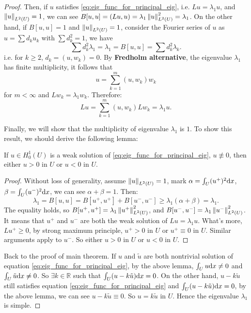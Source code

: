 \begin{proof}
    Then, if $u$ satisfies \eqref{eq:eig_func_for_principal_eig}, i.e. $Lu=\lambda_{1}u$, and $\left\|u\right\|_{L^{2}(U)}=1$, we can see $B[u,u]=(Lu,u)=\lambda_{1}\left\|u\right\|_{L^{2}(U)}^{2}=\lambda_{1}$. On the other hand, if $B[u,u]=1$ and $\left\|u\right\|_{L^{2}(U)}=1$, consider the Fourier series of $u$ as $u=\sum d_{k}u_{k}$ with $\sum d_{k}^{2}=1$, we have 
    \begin{equation}
        \sum d_{k}^{2}\lambda_{1}=\lambda_{1}=B[u,u]=\sum d_{k}^{2}\lambda_{k}.
    \end{equation}
    i.e. for $k\ge 2$, $d_{k}=(u,w_{k})=0$. By \textbf{Fredholm alternative}, the eigenvalue $\lambda_{1}$ has finite multiplicity, it follows that 
    \begin{equation}
        u=\sum_{k=1}^{m}(u,w_{k})w_{k}
    \end{equation}
    for $m<\infty$ and $Lw_{k}=\lambda_{1}w_{k}$. Therefore:
    \begin{equation}
        Lu=\sum_{k=1}^{m}(u,w_{k})Lw_{k}=\lambda_{1}u.
    \end{equation}

    Finally, we will show that the multiplicity of eigenvalue $\lambda_{1}$ is $1$. To show this result, we should derive the following lemma:
    \begin{lemma}
        If $u\in H_{0}^{1}(U)$ is a weak solution of \eqref{eq:eig_func_for_principal_eig}, $u\not\equiv 0$, then either $u>0$ in $U$ or $u<0$ in $U$.
    \end{lemma}
    \begin{proof}
        Without loss of generality, assume $\left\|u\right\|_{L^{2}(U)}=1$, mark $\alpha=\int_{U}(u^{+})^{2}\mathrm{d} x$, $\beta=\int_{U}(u^{-})^{2}\mathrm{d} x$, we can see $\alpha+\beta=1$. Then:
        \begin{equation}
            \lambda_{1}=B[u,u]=B[u^{+},u^{+}]+B[u^{-},u^{-}]\ge \lambda_{1}(\alpha+\beta)=\lambda_{1}.
        \end{equation}
        The equality holds, so $B[u^{+},u^{+}]=\lambda_{1}\left\|u^{+}\right\|_{L^{2}(U)}^{2}$, and $B[u^{-},u^{-}]=\lambda_{1}\left\|u^{-}\right\|_{L^{2}(U)}^{2}$. It means that $u^{+}$ and $u^{-}$ are both the weak solution of $Lu=\lambda_{1}u$. What's more, $Lu^{+}\ge 0$, by strong maximum principle, $u^{+}>0$ in $U$ or $u^{+}\equiv 0$ in $U$. Similar arguments apply to $u^{-}$. So either $u>0$ in $U$ or $u<0$ in $U$.
    \end{proof}
    Back to the proof of main theorem. If $u$ and $\tilde{u}$ are both nontrivial solution of equation \eqref{eq:eig_func_for_principal_eig}, by the above lemma, $\int_{U}u\mathrm{d} x\neq 0$ and $\int_{U}\tilde{u}\mathrm{d} x\neq 0$. So $\exists k\in\mathbb{R}$ such that $\int_{U}(u-k\tilde{u})\mathrm{d} x=0$. On the other hand, $u-k\tilde{u}$ still satisfies equation \eqref{eq:eig_func_for_principal_eig} and $\int_{U}(u-k\tilde{u})\mathrm{d} x=0$, by the above lemma, we can see $u-k\tilde{u}\equiv 0$. So $u=k\tilde{u}$ in $U$. Hence the eigenvalue $\lambda_{1}$ is simple.
\end{proof}
